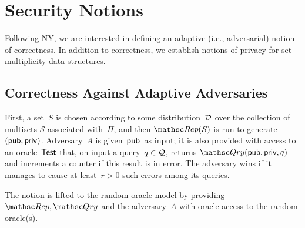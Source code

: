 \section{Security Notions}
\label{sec:security-notions}
Following NY, we are interested in defining an adaptive (i.e.,
adversarial) notion of correctness.
In addition to correctness, we establish notions of privacy for
set-multiplicity data structures.


\subsection{Correctness Against Adaptive Adversaries}

First, a set~$S$ is chosen according to some
distribution~$\mathcal{D}_{}^{}$ over the collection of multisets
$\mathcal{S}$ associated with~$\Pi$, and then
$\Rep(S)$ is run to generate $({\sf pub},{\sf priv})$.  
Adversary~$A$ is given~${\sf pub}$~as input; it is also
provided with access to an oracle~$\mathsf{Test}$ that, on input a query~$q \in {\cal Q}$,
returns $\Qry(\pubaux,\privaux,q)$ and increments
a counter if this result is in error.  The adversary wins if it
manages to cause at least~$r>0$ such errors among its queries.
 

The notion is lifted to the random-oracle model by providing
$\Rep,\Qry$ and the adversary~$A$ with oracle access to the
random-oracle(s).

 



